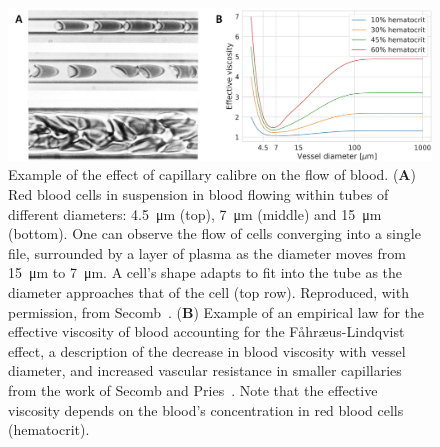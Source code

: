 \documentclass{article}
\begin{document}
\begin{figure}[t!]
  \centering
  \includegraphics[width=\textwidth]{EffectiveViscosity}
  \caption{Example of the effect of capillary calibre on the flow of blood. (\textbf{A}) Red blood cells in suspension in blood flowing within tubes of different diameters: \SI{4.5}{\micro\meter} (top), \SI{7}{\micro\meter} (middle) and \SI{15}{\micro\meter} (bottom). One can observe the flow of cells converging into a single file, surrounded by a layer of plasma as the diameter moves from \SI{15}{\micro\meter} to \SI{7}{\micro\meter}. A cell's shape adapts to fit into the tube as the diameter approaches that of the cell (top row). Reproduced, with permission, from Secomb~\cite{Secomb_2003}. (\textbf{B}) Example of an empirical law for the effective viscosity of blood accounting for the F\r{a}hr\ae us-Lindqvist effect, a description of the decrease in blood viscosity with vessel diameter, and increased vascular resistance in smaller capillaries from the work of Secomb and Pries~\cite{Secomb_2013}. Note that the effective viscosity depends on the blood's concentration in red blood cells (hematocrit).}
  \label{fig:effectiveViscosity}
\end{figure}
\end{document}
